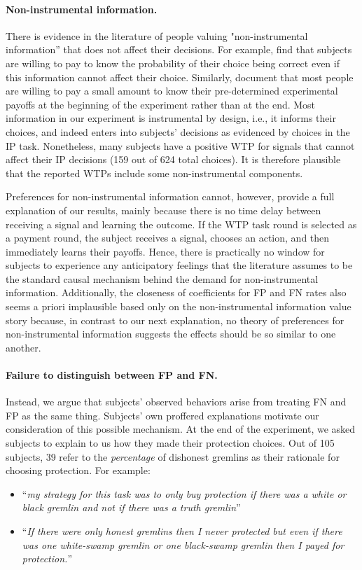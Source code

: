 \documentclass[12pt,a4paper]{article}
\begin{document}
\paragraph{Non-instrumental information.} There is evidence in the literature of people valuing "non-instrumental information'' that does not affect their decisions. For example, \citet{eliaz_paying_2010} find that subjects are willing to pay to know the probability of their choice being correct even if this information cannot affect their choice. Similarly, \citet{ganguly_fantasy_2017} document that most people are willing to pay a small amount to know their pre-determined experimental payoffs at the beginning of the experiment rather than at the end. 
Most information in our experiment is instrumental by design, i.e., it informs their choices, and indeed enters into subjects' decisions as evidenced by choices in the IP task. Nonetheless, many subjects have a positive WTP for signals that cannot affect their IP decisions (159 out of 624 total choices). It is therefore plausible that the reported WTPs include some non-instrumental components. 

Preferences for non-instrumental information cannot, however, provide a full explanation of our results, mainly because there is no time delay between receiving a signal and learning the outcome. If the WTP task round is selected as a payment round, the subject receives a signal, chooses an action, and then immediately learns their payoffs. Hence, there is practically no window for subjects to experience any anticipatory feelings that the literature assumes to be the standard causal mechanism behind the demand for non-instrumental information. Additionally, the closeness of coefficients for FP and FN rates also seems a priori implausible based only on the non-instrumental information value story because, in contrast to our next explanation, no theory of preferences for non-instrumental information suggests the effects should be so similar to one another.

\paragraph{Failure to distinguish between FP and FN.} Instead, we argue that subjects' observed behaviors arise from treating FN and FP as the same thing. Subjects' own proffered explanations motivate our consideration of this possible mechanism.  At the end of the experiment, we asked subjects to explain to us how they made their protection choices.  Out of 105 subjects, 39 refer to the \textit{percentage} \normalfont  of dishonest gremlins as their rationale for choosing protection. For example:
\begin{itemize}
	\item ``\emph{my strategy for this task was to only buy protection if there was a white or black gremlin and not if there was a truth gremlin}''
	\item ``\emph{If there were only honest gremlins then I never protected but even if there was one white-swamp gremlin or one black-swamp gremlin then I payed for protection.}''
\end{itemize}
\end{document}

